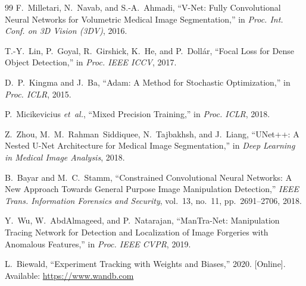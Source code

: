 \documentclass[conference]{IEEEtran}
\begin{document}
\begin{thebibliography}{99}
F.~Milletari, N.~Navab, and S.-A.~Ahmadi, ``V-Net: Fully Convolutional Neural Networks for Volumetric Medical Image Segmentation,'' in \textit{Proc. Int. Conf. on 3D Vision (3DV)}, 2016.

T.-Y.~Lin, P.~Goyal, R.~Girshick, K.~He, and P.~Doll\'{a}r, ``Focal Loss for Dense Object Detection,'' in \textit{Proc. IEEE ICCV}, 2017.

D.~P.~Kingma and J.~Ba, ``Adam: A Method for Stochastic Optimization,'' in \textit{Proc. ICLR}, 2015.

P.~Micikevicius \textit{et~al.}, ``Mixed Precision Training,'' in \textit{Proc. ICLR}, 2018.

Z.~Zhou, M.~M.~Rahman~Siddiquee, N.~Tajbakhsh, and J.~Liang, ``UNet++: A Nested U-Net Architecture for Medical Image Segmentation,'' in \textit{Deep Learning in Medical Image Analysis}, 2018.

B.~Bayar and M.~C.~Stamm, ``Constrained Convolutional Neural Networks: A New Approach Towards General Purpose Image Manipulation Detection,'' \textit{IEEE Trans. Information Forensics and Security}, vol.~13, no.~11, pp.~2691--2706, 2018.

Y.~Wu, W.~AbdAlmageed, and P.~Natarajan, ``ManTra-Net: Manipulation Tracing Network for Detection and Localization of Image Forgeries with Anomalous Features,'' in \textit{Proc. IEEE CVPR}, 2019.

L.~Biewald, ``Experiment Tracking with Weights and Biases,'' 2020. [Online]. Available: \url{https://www.wandb.com}

\end{thebibliography}
\end{document}
